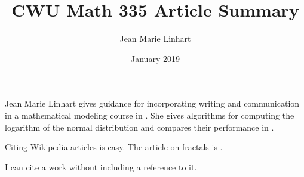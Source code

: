 \documentclass[12pt]{extarticle}
\title{CWU Math 335 Article Summary}
\author{Jean Marie Linhart}
\date{January 2019}
\begin{document}
\maketitle

Jean Marie Linhart gives guidance for incorporating writing and communication in a mathematical modeling course in \cite{Linhart2014}.  She gives algorithms for computing the logarithm of the normal distribution and compares their performance in \cite{Linhart2008}.

Citing Wikipedia articles is easy.  The article on fractals is \cite{fractalwiki}.

I can cite a work without including a reference to it.  \nocite{higham1998handbook}




\end{document}
